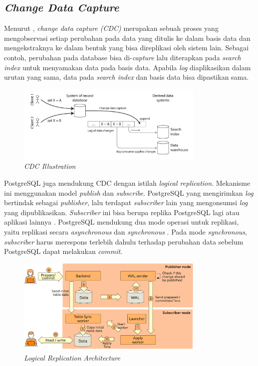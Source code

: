 \subsection{\textit{Change Data Capture}}

Menurut \cite{dataIntensiveApplications}, \textit{change data capture (CDC)} merupakan sebuah proses yang mengobservasi setiap perubahan pada data yang ditulis ke dalam basis data dan mengekstraknya ke dalam bentuk yang bisa direplikasi oleh sistem lain. Sebagai contoh, perubahan pada database bisa di-\textit{capture} lalu diterapkan pada \textit{search index} untuk menyamakan data pada basis data. Apabila \textit{log} diaplikasikan dalam urutan yang sama, data pada \textit{search index} dan basis data bisa dipastikan sama.

\begin{figure}[ht]
    \centering
    \includegraphics[width=0.8\textwidth]{resources/chapter-2/cdc.png}
    \caption{\textit{CDC Illustration \parencite{dataIntensiveApplications}}}
    \label{fig:cdc-illustration}
\end{figure}

PostgreSQL juga mendukung CDC dengan istilah \textit{logical replication}. Mekanisme ini menggunakan model \textit{publish} dan \textit{subscribe}. PostgreSQL yang mengirimkan \textit{log} bertindak sebagai \textit{publisher}, lalu terdapat \textit{subscriber} lain yang mengonsumsi \textit{log} yang dipublikasikan. \textit{Subscriber} ini bisa berupa replika PostgreSQL lagi atau aplikasi lainnya \parencite{pgLogicalReplication}. PostgreSQL mendukung dua mode operasi untuk replikasi, yaitu replikasi secara \textit{asynchronous} dan \textit{synchronous} \parencite{insideLogicalReplication}. Pada mode \textit{synchronous}, \textit{subscriber} harus merespons terlebih dahulu terhadap perubahan data sebelum PostgreSQL dapat melakukan \textit{commit}.

\begin{figure}[ht]
    \centering
    \includegraphics[width=0.8\textwidth]{resources/chapter-2/postgres-logical-replication.png}
    \caption{\textit{Logical Replication Architecture \parencite{insideLogicalReplication}}}
    \label{fig:logical-replication-architecture}
\end{figure}

